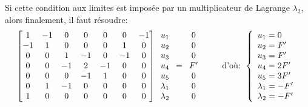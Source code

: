 Si cette condition aux limites est imposée par un multiplicateur de Lagrange $\lambda_2$, alors finalement, il faut résoudre:
\begin{equation}
\begin{bmatrix} 1&-1&0&0&0&0&-1 \\ -1&1&0&0&0&1&0 \\ 0&0&1&-1&0&-1&0\\ 
0&0&-1&2&-1&0&0\\ 0&0&0&-1&1&0&0 \\ 0&1&-1&0&0&0&0 \\ 1&0&0&0&0&0&0
\end{bmatrix}
\mathbf{\begin{array}{c} u_1\\u_2\\u_3\\u_4\\ u_5\\ \lambda_1 \\ \lambda_2 \end{array}}
=
\mathbf{\begin{array}{c} 0\\0\\0\\F' \\ 0 \\ 0 \\ 0\end{array}}
\qquad \text{ d'où: } 
\left\{\begin{array}{l} u_1=0 \\ u_2=F' \\ u_3=F' \\ u_4=2F' \\ u_5=3F' \\ \lambda_1 = -F' \\ \lambda_2 = -F' \end{array}\right.
\end{equation}